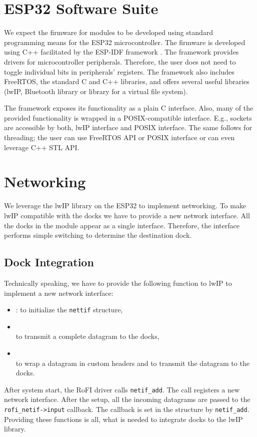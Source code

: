 \section{ESP32 Software Suite} \label{sec:hardware}

We expect the firmware for modules to be developed using standard programming
means for the ESP32 microcontroller. The firmware is developed using C++
facilitated by the ESP-IDF framework \cite{noauthor_esp-idf_nodate}. The
framework provides drivers for microcontroller peripherals. Therefore, the user
does not need to toggle individual bits in peripherals' registers. The framework
also includes FreeRTOS, the standard C and C++ libraries, and offers several
useful libraries (lwIP, Bluetooth library or library for a virtual file
system).

The framework exposes its functionality as a plain C interface. Also, many of
the provided functionality is wrapped in a POSIX-compatible interface. E.g.,
sockets are accessible by both, lwIP interface and POSIX interface. The same
follows for threading; the user can use FreeRTOS API or POSIX interface or can
even leverage C++ STL API.

\section{Networking} \label{sec:networking}

We leverage the lwIP library on the ESP32 to implement networking. To make lwIP
compatible with the docks we have to provide a new network interface.
All the docks in the module appear as a single interface. Therefore, the
interface performs simple switching to determine the destination dock.

\subsection{Dock Integration}

Technically speaking, we have to provide the following function to lwIP to
implement a new network interface:
\begingroup
\setlength{\rightskip}{0pt plus 1 fil}
\begin{itemize}
    \item {}:
    to initialize the \texttt{nettif} structure,
    \item {} \\
    to transmit a complete datagram to the docks,
    \item {} \\ 
    to wrap a datagram in custom headers and to transmit the datagram to the
    docks.
\end{itemize}
\endgroup
After system start, the RoFI driver calls \texttt{netif\_add}. The call
registers a new network interface. After the setup, all the incoming datagrams
are passed to the \texttt{rofi\_netif->input} callback. The callback is set in
the structure by \texttt{netif\_add}. Providing these functions is all, what is
needed to integrate docks to the lwIP library.

